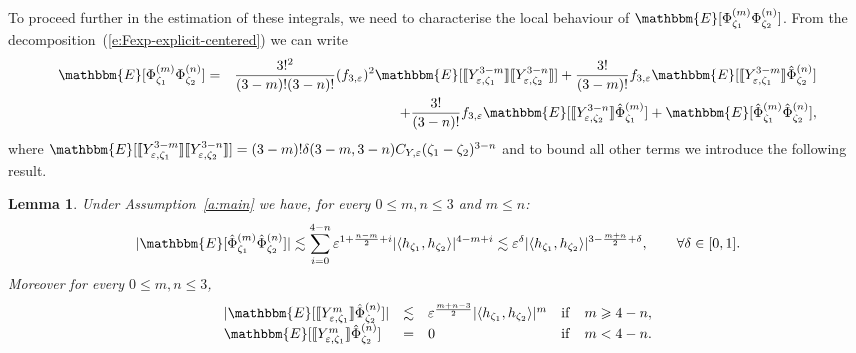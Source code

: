 \documentclass[a4paper,11pt]{article}
\newcommand{\tmop}[1]{\ensuremath{\operatorname{#1}}}
\newtheorem{lemma}[theorem]{Lemma}
{\theorembodyfont{\rmfamily}\newtheorem{remark}[theorem]{Remark}}
\begin{document}
To proceed further in the estimation of these integrals, we need to
characterise the local behaviour of $\mathbbm{E} [\Phi^{(m)}_{\zeta_1}
\Phi^{(n)}_{\zeta_2}]$. From the
decomposition~(\ref{e:Fexp-explicit-centered}) we can write
\begin{eqnarray*}
  \mathbbm{E} [\Phi^{(m)}_{\zeta_1} \Phi^{(n)}_{\zeta_2}] & = & \frac{3!^2}{(3
  - m) ! (3 - n) !} (f_{3, \varepsilon})^2 \mathbbm{E} [\llbracket Y^{3 -
  m}_{\varepsilon, \zeta_1} \rrbracket \llbracket Y^{3 - n}_{\varepsilon,
  \zeta_2} \rrbracket] + \frac{3!}{(3 - m) !} f_{3, \varepsilon} \mathbbm{E}
  [\llbracket Y^{3 - m}_{\varepsilon, \zeta_1} \rrbracket
  \hat{\Phi}_{\zeta_2}^{(n)}]\\
  &  & + \frac{3!}{(3 - n) !} f_{3, \varepsilon} \mathbbm{E} [\llbracket Y^{3
  - n}_{\varepsilon, \zeta_2} \rrbracket \hat{\Phi}_{\zeta_1}^{(m)}]
  +\mathbbm{E} [\hat{\Phi}_{\zeta_1}^{(m)} \hat{\Phi}_{\zeta_2}^{(n)}],
\end{eqnarray*}
where $\mathbbm{E} [\llbracket Y^{3 - m}_{\varepsilon, \zeta_1} \rrbracket
\llbracket Y^{3 - n}_{\varepsilon, \zeta_2} \rrbracket] = (3 - m) ! \delta (3
- m, 3 - n) C_{Y, \varepsilon} (\zeta_1 - \zeta_2)^{3 - n}$ and to bound all
other terms we introduce the following result.

\begin{lemma}
  \label{l:bound-corr}Under Assumption~\ref{a:main} we have, for every $0
  \leqslant m, n \leqslant 3$ and $m \leqslant n$:
  \[ | \mathbbm{E} [\hat{\Phi}^{(m)}_{\zeta_1} \hat{\Phi}^{(n)}_{\zeta_2}] |
     \lesssim \sum_{i = 0}^{4 - n} \varepsilon^{1 + \frac{n - m}{2} + i} |
     \langle h_{\zeta_1}, h_{\zeta_2} \rangle |^{4 - m + i} \lesssim
     \varepsilon^{\delta} | \langle h_{\zeta_1}, h_{\zeta_2} \rangle |^{3 -
     \frac{m + n}{2} + \delta}, \qquad \forall \delta \in [0, 1] . \]
  Moreover for every $0 \leqslant m, n \leqslant 3$,
  \[ \begin{array}{lllll}
       | \mathbbm{E} [\llbracket Y^m_{\varepsilon, \zeta_1} \rrbracket
       \hat{\Phi}^{(n)}_{\zeta_2}] | & \lesssim & \varepsilon^{\frac{m + n -
       3}{2}} | \langle h_{\zeta_1}, h_{\zeta_2} \rangle |^m & \tmop{if} & m
       \geqslant 4 - n,\\
       \mathbbm{E} [\llbracket Y^m_{\varepsilon, \zeta_1} \rrbracket
       \hat{\Phi}^{(n)}_{\zeta_2}] & = & 0 & \tmop{if} & m < 4 - n.
     \end{array} \]
\end{lemma}
\end{document}
